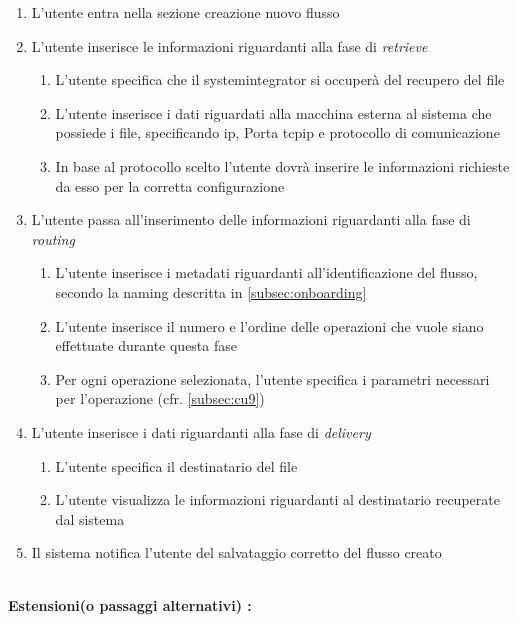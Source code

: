 \begin{enumerate}
  \item L’utente entra nella sezione creazione nuovo flusso
  \item L’utente inserisce le informazioni riguardanti alla fase di \textit{retrieve}
    \begin{enumerate}
        \item L'utente specifica che il \gls{systemintegrator} si occuperà del recupero del file
        \item L'utente inserisce i dati riguardati alla macchina esterna al sistema che possiede i file, specificando \gls{ip}, Porta \gls{tcpip} e protocollo di comunicazione
        \item In base al protocollo scelto l'utente dovrà inserire le informazioni richieste da esso per la corretta configurazione
    \end{enumerate}
  \item L'utente passa all'inserimento delle informazioni riguardanti alla fase di \textit{routing} 
  \begin{enumerate}
      \item L'utente inserisce i metadati riguardanti all'identificazione del flusso, secondo la naming descritta in \ref{subsec:onboarding}
      \item L'utente inserisce il numero e l'ordine delle operazioni che vuole siano effettuate durante questa fase
      \item Per ogni operazione selezionata, l'utente specifica i parametri necessari per l'operazione (cfr. \ref{subsec:cu9})
  \end{enumerate}
  \item L’utente inserisce i dati riguardanti alla fase di \textit{delivery}
  \begin{enumerate}
      \item L'utente specifica il destinatario del file
      \item L'utente visualizza le informazioni riguardanti al destinatario recuperate dal sistema
  \end{enumerate}
  \item Il sistema notifica l'utente del salvataggio corretto del flusso creato
\end{enumerate} 
\  \\
\textbf{Estensioni(o passaggi alternativi) :}
